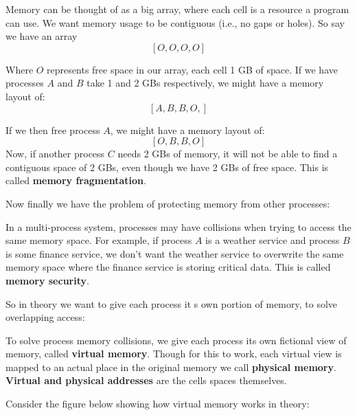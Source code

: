\begin{Def}
    
    Memory can be thought of as a big array, where each cell is a resource a program can use.
    We want memory usage to be contiguous (i.e., no gaps or holes). So say we have an array 
    $$[O, O, O, O]$$

    \noindent
    Where $O$ represents free space in our array, each cell 1 GB of space. If we have processes $A$ and $B$ take 1 and 2 GBs respectively, we might have a memory layout of:
    $$[A, B, B, O,]$$

    \noindent
    If we then free process $A$, we might have a memory layout of:
    $$[O, B, B, O]$$
    \noindent
    Now, if another process $C$ needs 2 GBs of memory, it will not be able to find a contiguous space of 2 GBs, even though we have 2 GBs of free space.
    This is called \textbf{memory fragmentation}.
\end{Def}

\noindent
Now finally we have the problem of protecting memory from other processes:

\begin{Def}

    In a multi-process system, processes may have collisions when trying to access the same memory space.
    For example, if process $A$ is a weather service and process $B$ is some finance service, we don't want 
    the weather service to overwrite the same memory space where the finance service is storing critical data.
    This is called \textbf{memory security}.
\end{Def}

\noindent
So in theory we want to give each process it s own portion of memory, to solve overlapping access:
\begin{Def}

    To solve process memory collisions, we give each process its own fictional view of memory, called \textbf{virtual memory}.
    Though for this to work, each virtual view is mapped to an actual place in the original memory we call \textbf{physical memory}.\\

    \noindent
    \textbf{Virtual and physical addresses} are the cells spaces themselves.
\end{Def}

\newpage 

\noindent
Consider the figure below showing how virtual memory works in theory:

